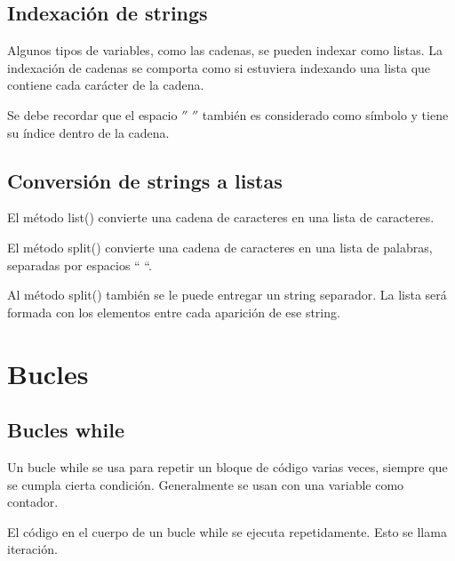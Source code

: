 \documentclass{report}
\begin{document}

\section{Indexación de strings}

Algunos tipos de variables, como las cadenas, se pueden indexar como listas. La indexación de cadenas se comporta como si estuviera indexando una lista que contiene cada carácter de la cadena.


Se debe recordar que el espacio $''$ $''$ también es considerado como símbolo y tiene su índice dentro de la cadena.

\section{Conversión de strings a listas}

El método list() convierte una cadena de caracteres en una lista de caracteres.


El método split() convierte una cadena de caracteres en una lista de palabras, separadas por espacios “ “.



Al método split() también se le puede entregar un string separador. La lista será formada con los elementos entre cada aparición de ese string.


\clearpage\chapter{Bucles}

\section{Bucles while}

Un bucle while se usa para repetir un bloque de código varias veces, siempre que se cumpla cierta condición. Generalmente se usan con una variable como contador.


El código en el cuerpo de un bucle while se ejecuta repetidamente. Esto se llama iteración.
\end{document}
